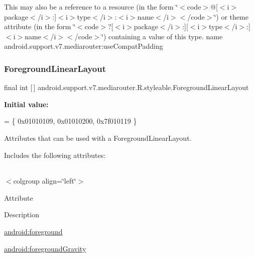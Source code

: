 This may also be a reference to a resource (in the form \char`\"{}$<$code$>$@\mbox{[}$<$i$>$package$<$/i$>$\+:\mbox{]}$<$i$>$type$<$/i$>$\+:$<$i$>$name$<$/i$>$$<$/code$>$\char`\"{}) or theme attribute (in the form \char`\"{}$<$code$>$?\mbox{[}$<$i$>$package$<$/i$>$\+:\mbox{]}\mbox{[}$<$i$>$type$<$/i$>$\+:\mbox{]}$<$i$>$name$<$/i$>$$<$/code$>$\char`\"{}) containing a value of this type.  name android.\+support.\+v7.\+mediarouter\+:use\+Compat\+Padding \mbox{\label{classandroid_1_1support_1_1v7_1_1mediarouter_1_1R_1_1styleable_a49fc131534b262fe1dc04e9f42f46d9b}} 
\subsubsection{\texorpdfstring{Foreground\+Linear\+Layout}{ForegroundLinearLayout}}
{\footnotesize\ttfamily final int \mbox{[}$\,$\mbox{]} android.\+support.\+v7.\+mediarouter.\+R.\+styleable.\+Foreground\+Linear\+Layout\hspace{0.3cm}{\ttfamily [static]}}

{\bfseries Initial value\+:}
\begin{DoxyCode}
= \{
            0x01010109, 0x01010200, 0x7f010119
        \}
\end{DoxyCode}
Attributes that can be used with a Foreground\+Linear\+Layout. 

Includes the following attributes\+:

\tabulinesep=1mm
\begin{longtabu} spread 0pt [c]{*{0}{|X[-1]}|}
\hline
\end{longtabu}
$<$colgroup align=\char`\"{}left\char`\"{}$>$ 

Attribute

Description 

{\ttfamily \hyperlink{classandroid_1_1support_1_1v7_1_1mediarouter_1_1R_1_1styleable_ab8851867a96c3cbe9b169e1c26ce1a76}{android\+:foreground}}

{\ttfamily \hyperlink{classandroid_1_1support_1_1v7_1_1mediarouter_1_1R_1_1styleable_a853dd75e050dc0c4b4fca83329d52f96}{android\+:foreground\+Gravity}}

